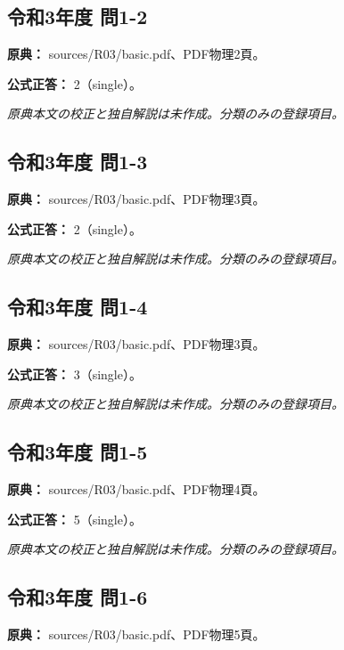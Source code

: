 \subsection{令和3年度 問1-2}
\label{q:r03-reg-basic-1-2}

\noindent\textbf{原典：} sources/R03/basic.pdf、PDF物理2頁。

\textbf{公式正答：} 2（single）。

\par\textit{原典本文の校正と独自解説は未作成。分類のみの登録項目。}

\subsection{令和3年度 問1-3}
\label{q:r03-reg-basic-1-3}

\noindent\textbf{原典：} sources/R03/basic.pdf、PDF物理3頁。

\textbf{公式正答：} 2（single）。

\par\textit{原典本文の校正と独自解説は未作成。分類のみの登録項目。}

\subsection{令和3年度 問1-4}
\label{q:r03-reg-basic-1-4}

\noindent\textbf{原典：} sources/R03/basic.pdf、PDF物理3頁。

\textbf{公式正答：} 3（single）。

\par\textit{原典本文の校正と独自解説は未作成。分類のみの登録項目。}

\subsection{令和3年度 問1-5}
\label{q:r03-reg-basic-1-5}

\noindent\textbf{原典：} sources/R03/basic.pdf、PDF物理4頁。

\textbf{公式正答：} 5（single）。

\par\textit{原典本文の校正と独自解説は未作成。分類のみの登録項目。}

\subsection{令和3年度 問1-6}
\label{q:r03-reg-basic-1-6}

\noindent\textbf{原典：} sources/R03/basic.pdf、PDF物理5頁。


